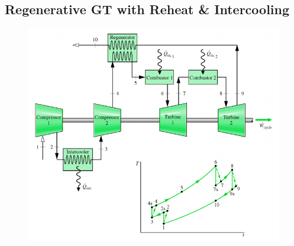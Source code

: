 \documentclass[class=report, crop=false, 12pt,a4paper]{standalone}
\numberwithin{equation}{section}
\begin{document}
\subsection{Regenerative GT with Reheat \& Intercooling}
\begin{figure}[H]
  \centering
  \includegraphics[width = 1 \textwidth]{../img/diagram172.png}
  \caption{}
\end{figure}
\end{document}
